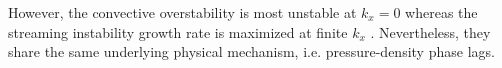 However, the convective overstability is most unstable at $k_x=0$
\citep{latter14}  whereas the streaming instability growth rate is maximized at finite $k_x$
\citep{youdin05a}. Nevertheless, they share the same underlying
physical mechanism, i.e. pressure-density phase lags.  





